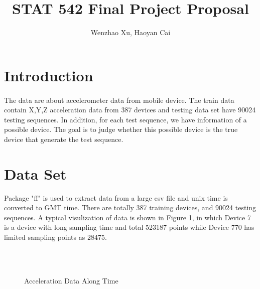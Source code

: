 \documentclass{article}
\author{Wenzhao Xu, Haoyan Cai}
\title{STAT 542 Final Project Proposal}
\begin{document}
	\maketitle
	
	\section{Introduction} %
	\label{sec:introduction}
	
	\paragraph{} The data are about accelerometer data from mobile device. The train data contain X,Y,Z acceleration data from 387 devices and testing data set have 90024 testing sequences. In addition, for each test sequence, we have information of a possible device. The goal is to judge whether this possible device is the true device that generate the test sequence. 
	
	
	\section{Data Set} %
	\label{sec:section_name}
	Package "ff" is used to extract data from a large csv file and unix time is converted to GMT time. There are totally 387 training devices, and 90024 testing sequences. A typical visulization of data is shown in Figure 1, in which Device 7 is a device with long sampling time and total 523187 points while Device 770 has limited sampling points as 28475.
	\begin{figure}
		\centering
		\\
		 \\
		\caption{Acceleration Data Along Time}
	\end{figure}
	
\end{document}
